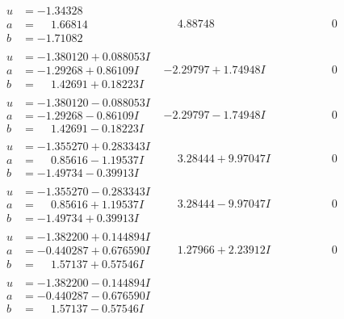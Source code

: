 \documentclass[1p]{elsarticle_modified}
\theoremstyle{definition}
\begin{document}
$$\begin{array}{c|c|c}
\begin{aligned}
u &= -1.34328\phantom{ +0.000000I} \\
a &= \phantom{-}1.66814\phantom{ +0.000000I} \\
b &= -1.71082\phantom{ +0.000000I}\end{aligned}
 & \phantom{-}4.88748\phantom{ +0.000000I} & \phantom{-0.000000 } 0 \\ \hline\begin{aligned}
u &= -1.380120 + 0.088053 I \\
a &= -1.29268 + 0.86109 I \\
b &= \phantom{-}1.42691 + 0.18223 I\end{aligned}
 & -2.29797 + 1.74948 I & \phantom{-0.000000 } 0 \\ \hline\begin{aligned}
u &= -1.380120 - 0.088053 I \\
a &= -1.29268 - 0.86109 I \\
b &= \phantom{-}1.42691 - 0.18223 I\end{aligned}
 & -2.29797 - 1.74948 I & \phantom{-0.000000 } 0 \\ \hline\begin{aligned}
u &= -1.355270 + 0.283343 I \\
a &= \phantom{-}0.85616 - 1.19537 I \\
b &= -1.49734 - 0.39913 I\end{aligned}
 & \phantom{-}3.28444 + 9.97047 I & \phantom{-0.000000 } 0 \\ \hline\begin{aligned}
u &= -1.355270 - 0.283343 I \\
a &= \phantom{-}0.85616 + 1.19537 I \\
b &= -1.49734 + 0.39913 I\end{aligned}
 & \phantom{-}3.28444 - 9.97047 I & \phantom{-0.000000 } 0 \\ \hline\begin{aligned}
u &= -1.382200 + 0.144894 I \\
a &= -0.440287 + 0.676590 I \\
b &= \phantom{-}1.57137 + 0.57546 I\end{aligned}
 & \phantom{-}1.27966 + 2.23912 I & \phantom{-0.000000 } 0 \\ \hline\begin{aligned}
u &= -1.382200 - 0.144894 I \\
a &= -0.440287 - 0.676590 I \\
b &= \phantom{-}1.57137 - 0.57546 I\end{aligned}

\end{array}$$
\end{document}
